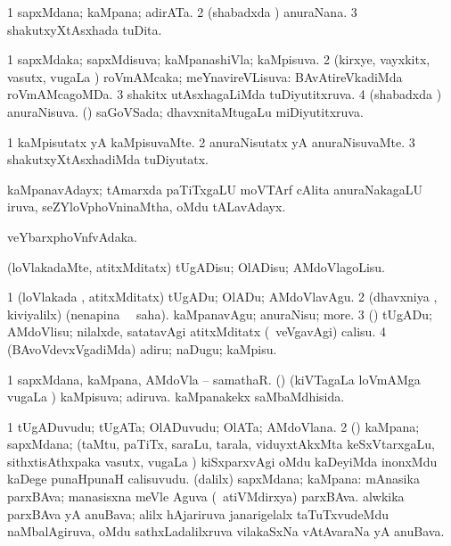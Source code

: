 \bentry
{} 
\gl{\nA}
\expl{}
\bmng
\bnum
\num{1} sapxMdana; kaMpana; adirATa. 
\num{2} (shabadxda \vi) anuraNana. 
\num{3} shakutxyXtAsxhada tuDita. 
\enum
\emng
\eentry

\bentry
{} 
\gl{\gu}
\expl{}
\bmng
\bnum
\num{1} sapxMdaka; sapxMdisuva; kaMpanashiVla; kaMpisuva. 
\num{2} (kirxye, vayxkitx, vasutx, \mo vugaLa \vi) roVmAMcaka; meYnavireVLisuva:  BAvAtireVkadiMda roVmAMcagoMDa. 
\num{3} shakitx utAsxhagaLiMda tuDiyutitxruva. 
\num{4} (shabadxda \vi) anuraNisuva. (\dhavxni) saGoVSada; dhavxnitaMtugaLu miDiyutitxruva. 
\enum
\emng
\eentry

\bentry
{} 
\gl{\kirxvi}
\expl{}
\bmng
\bnum
\num{1} kaMpisutatx yA kaMpisuvaMte. 
\num{2} anuraNisutatx yA anuraNisuvaMte. 
\num{3} shakutxyXtAsxhadiMda tuDiyutatx. 
\enum
\emng
\eentry

\bentry
{} 
\gl{\nA}
\expl{}
\bmng
 kaMpanavAdayx; tAmarxda paTiTxgaLU moVTArf cAlita anuraNakagaLU iruva, seZYloVphoVninaMtha, oMdu tALavAdayx. 
\emng
\eentry

\bentry
{} 
\gl{\nA}
\expl{}
\bmng
veYbarxphoVnfvAdaka. 
\emng
\eentry

\bentry
{} 
\gl{\sakirx}
\expl{}
\bmng
 (loVlakadaMte, atitxMditatx) tUgADisu; OlADisu; AMdoVlagoLisu. 
\emng

\noindent
\gl{\akirx}
\expl{}
\bmng
\bnum
\num{1} (loVlakada \vi, atitxMditatx) tUgADu; OlADu; AMdoVlavAgu. 
\num{2} (dhavxniya \vi, kiviyalilx) (nenapina \vi\ \rUpa\ saha). kaMpanavAgu; anuraNisu; more. 
\num{3} (\Bwvi) tUgADu; AMdoVlisu; nilalxde, satatavAgi atitxMditatx (\kanmu\ veVgavAgi) calisu. 
\num{4} (BAvoVdevxVgadiMda) adiru; naDugu; kaMpisu. 
\enum
\emng
\eentry

\bentry
{} 
\gl{\gu}
\expl{}
\bmng
\bnum
\num{1} sapxMdana, kaMpana, AMdoVla -- samathaR. 
 (\jiVvi) 
\banum
{} (kiVTagaLa loVmAMga \mo vugaLa \vi) kaMpisuva; adiruva. 
 kaMpanakekx saMbaMdhisida. 
\eanum
\numie
\enum
\emng
\eentry

\bentry
{} 
\gl{\nA}
\expl{}
\bmng
\bnum
\num{1} tUgADuvudu; tUgATa; OlADuvudu; OlATa; AMdoVlana. 
\num{2} (\Bwvi) kaMpana; sapxMdana; (taMtu, paTiTx, saraLu, tarala, viduyxtAkxMta keSxVtarxgaLu, sithxtisAthxpaka vasutx, \mo vugaLa \vi) kiSxparxvAgi oMdu kaDeyiMda inonxMdu kaDege punaHpunaH calisuvudu. 
 (\bava dalilx) sapxMdana; kaMpana: 
\banum
{} mAnasika parxBAva; manasisxna meVle Aguva (\kanmu\ atiVMdirxya) parxBAva. 
 alwkika parxBAva yA anuBava; alilx hAjariruva janarigelalx taTuTxvudeMdu naMbalAgiruva, oMdu sathxLadalilxruva vilakaSxNa vAtAvaraNa yA anuBava. 
\eanum
\numie
\enum
\emng
\eentry

